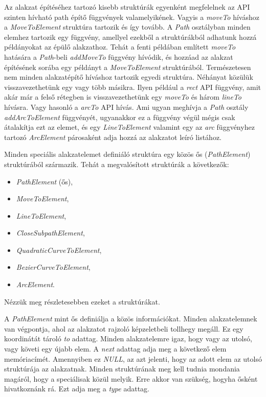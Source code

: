 \documentclass[12pt]{report}
\theoremstyle{definition}
\newcommand{\func}[1]{{\textsl{#1}}}
\begin{document}
Az alakzat építéséhez tartozó kisebb struktúrák egyenként megfelelnek az API
szinten hívható path építő függvények valamelyikének. Vagyis a \func{moveTo}
híváshoz a \func{MoveToElement} struktúra tartozik és így tovább. A \func{Path}
osztályban minden elemhez tartozik egy függvény, amellyel ezekből a
struktúrákból adhatunk hozzá példányokat az épülő alakzathoz. Tehát a fenti
példában említett \func{moveTo} hatására a \func{Path}-beli \func{addMoveTo}
függvény hívódik, és hozzáad az alakzat építésének sorába egy példányt a
\func{MoveToElement} struktúrából. Természetesen nem minden alakzatépítő
híváshoz tartozik egyedi struktúra. Néhányat közülük visszavezethetünk egy vagy
több másikra. Ilyen például a \func{rect} API függvény, amit akár már a felső
rétegben is visszavezethetünk egy \func{moveTo} és három \func{lineTo} hívásra.
Vagy hasonló a \func{arcTo} API hívás. Ami ugyan meghívja a \func{Path} osztály
\func{addArcToElement} függvényét, ugyanakkor ez a függvény végül mégis csak
átalakítja ezt az elemet, és egy \func{LineToElement} valamint egy az
\func{arc} függvényhez tartozó \func{ArcElement} párosaként adja hozzá az
alakzatot leíró listához.

Minden speciális alakzatelemet definiáló struktúra egy közös ős
(\func{PathElement}) struktúrából származik. Tehát a megvalósított struktúrák a
következők:
  \begin{itemize}
    \item \func{PathElement} (ős),
    \item \func{MoveToElement},
    \item \func{LineToElement},
    \item \func{CloseSubpathElement},
    \item \func{QuadraticCurveToElement},
    \item \func{BezierCurveToElement},
    \item \func{ArcElement}.
  \end{itemize}
Nézzük meg részletesebben ezeket a struktúrákat.

A \func{PathElement} mint ős definiálja a közös információkat. Minden
alakzatelemnek van végpontja, ahol az alakzatot rajzoló képzeletbeli tollhegy
megáll. Ez egy koordinátát tároló \func{to} adattag. Minden alakzatelemre igaz,
hogy vagy az utolsó, vagy követi egy újabb elem. A \func{next} adattag adja meg
a következő elem memóriacímét. Amennyiben ez \func{NULL}, az azt jelenti, hogy
az adott elem az utolsó struktúrája az alakzatnak. Minden struktúrának meg kell
tudnia mondania magáról, hogy a speciálisak közül melyik. Erre akkor van
szükség, hogyha ősként hivatkoznánk rá. Ezt adja meg a \func{type} adattag.
\end{document}
